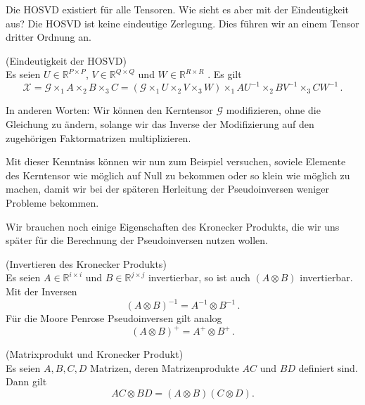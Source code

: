 Die HOSVD existiert für alle Tensoren. Wie sieht es aber mit der Eindeutigkeit aus? Die HOSVD ist keine eindeutige Zerlegung. Dies führen wir an einem Tensor dritter Ordnung an.

\begin{Beispiel} (Eindeutigkeit der HOSVD) \\
Es seien $U \in \mathbb{R}^{P \times P}$, $V \in \mathbb{R}^{Q \times Q}$  und $W \in \mathbb{R}^{R \times R}$ . Es gilt
\begin{equation}
{\pmb{\mathscr{X}}} = {\pmb{\mathscr{G}}} \times_1 A \times_2 B \times_3 C = ({\pmb{\mathscr{G}}} \times_1 U \times_2 V \times_3 W) \times_1 AU^{-1} \times_2 BV^{-1} \times_3 CW^{-1} \, .
\end{equation}
\end{Beispiel}

In anderen Worten: Wir können den Kerntensor ${\pmb{\mathscr{G}}}$ modifizieren, ohne die Gleichung zu ändern, solange wir das Inverse der Modifizierung auf den zugehörigen Faktormatrizen multiplizieren.

Mit dieser Kenntniss können wir nun zum Beispiel versuchen, soviele Elemente des Kerntensor wie möglich auf Null zu bekommen oder so klein wie möglich zu machen, damit wir bei der späteren Herleitung der Pseudoinversen weniger Probleme bekommen. 

Wir brauchen noch einige Eigenschaften des Kronecker Produkts, die wir uns später für die Berechnung der Pseudoinversen nutzen wollen.

\begin{Lemma} (Invertieren des Kronecker Produkts) \\ \label{lemma:inverse}
Es seien $A \in \mathbb{R}^{i \times i}$ und $B \in \mathbb{R}^{j \times j}$ invertierbar, so ist auch $(A \otimes B)$ invertierbar. Mit der Inversen
\begin{equation*}
(A \otimes B)^{-1} = A^{-1} \otimes B^{-1} \, . 
\end{equation*}
Für die Moore Penrose Pseudoinversen gilt analog
\begin{equation*}
(A \otimes B)^{+} = A^{+} \otimes B^{+} \, .
\end{equation*}
\end{Lemma}

\begin{Lemma} (Matrixprodukt und Kronecker Produkt) \label{lemma:prod} \\
Es seien $A,B,C,D$ Matrizen, deren Matrizenprodukte $AC$ und $BD$ definiert sind. Dann gilt
\begin{equation*}
AC \otimes BD = (A \otimes B)(C \otimes D).
\end{equation*}
\end{Lemma}

